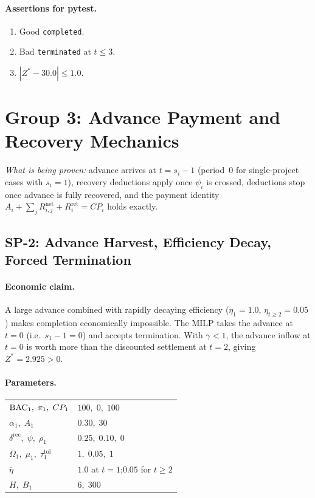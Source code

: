 \paragraph{Assertions for pytest.}
\begin{enumerate}[label=A\arabic*.]
  \item Good \texttt{completed}.
  \item Bad \texttt{terminated} at $t\leq3$.
  \item $|Z^*-30.0|\leq1.0$.
\end{enumerate}

\section{Group 3: Advance Payment and Recovery Mechanics}

\textit{What is being proven:} advance arrives at $t=s_i-1$
(period~0 for single-project cases with $s_i=1$), recovery
deductions apply once $\psi_i$ is crossed, deductions stop once
advance is fully recovered, and the payment identity
$A_i+\sum_j R_{i,j}^{\mathrm{net}}+R_i^{\mathrm{ret}}=CP_i$ holds
exactly.

\subsection{SP-2: Advance Harvest, Efficiency Decay, Forced Termination}

\paragraph{Economic claim.}
A large advance combined with rapidly decaying efficiency
($\eta_1=1.0$, $\eta_{t\geq2}=0.05$) makes completion economically
impossible. The MILP takes the advance at $t=0$ (i.e.\ $s_1-1=0$)
and accepts termination. With $\gamma<1$, the advance inflow at
$t=0$ is worth more than the discounted settlement at $t=2$, giving
$Z^*=2.925>0$.

\paragraph{Parameters.}
\begin{center}
\begin{tabular}{ll}
\toprule
$\mathrm{BAC}_1,\;\pi_1,\;CP_1$ & $100,\;0,\;100$\\
$\alpha_1,\;A_1$ & $0.30,\;30$\\
$\delta^{\mathrm{rec}},\;\psi,\;\rho_1$ & $0.25,\;0.10,\;0$\\
$\Omega_1,\;\mu_1,\;\tau_1^{\mathrm{tol}}$ & $1,\;0.05,\;1$\\
$\bar\eta$ & $1.0$ at $t=1$;\quad $0.05$ for $t\geq2$\\
$H,\;B_1$ & $6,\;300$\\
\bottomrule
\end{tabular}
\end{center}

